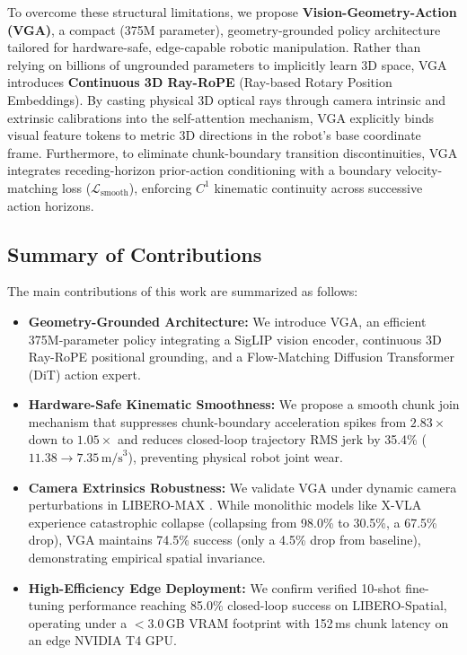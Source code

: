 To overcome these structural limitations, we propose \textbf{Vision-Geometry-Action (VGA)}, a compact (375M parameter), geometry-grounded policy architecture tailored for hardware-safe, edge-capable robotic manipulation. Rather than relying on billions of ungrounded parameters to implicitly learn 3D space, VGA introduces \textbf{Continuous 3D Ray-RoPE} (Ray-based Rotary Position Embeddings). By casting physical 3D optical rays through camera intrinsic and extrinsic calibrations into the self-attention mechanism, VGA explicitly binds visual feature tokens to metric 3D directions in the robot's base coordinate frame. Furthermore, to eliminate chunk-boundary transition discontinuities, VGA integrates receding-horizon prior-action conditioning with a boundary velocity-matching loss ($\mathcal{L}_{\text{smooth}}$), enforcing $C^1$ kinematic continuity across successive action horizons.

\subsection{Summary of Contributions}
The main contributions of this work are summarized as follows:
\begin{itemize}
    \item \textbf{Geometry-Grounded Architecture:} We introduce VGA, an efficient 375M-parameter policy integrating a SigLIP vision encoder, continuous 3D Ray-RoPE positional grounding, and a Flow-Matching Diffusion Transformer (DiT) action expert.
    \item \textbf{Hardware-Safe Kinematic Smoothness:} We propose a smooth chunk join mechanism that suppresses chunk-boundary acceleration spikes from $2.83\times$ down to $1.05\times$ and reduces closed-loop trajectory RMS jerk by 35.4\% ($11.38 \rightarrow 7.35\,\text{m/s}^3$), preventing physical robot joint wear.
    \item \textbf{Camera Extrinsics Robustness:} We validate VGA under dynamic camera perturbations in LIBERO-MAX \cite{liberomax2024}. While monolithic models like X-VLA experience catastrophic collapse (collapsing from 98.0\% to 30.5\%, a 67.5\% drop), VGA maintains 74.5\% success (only a 4.5\% drop from baseline), demonstrating empirical spatial invariance.
    \item \textbf{High-Efficiency Edge Deployment:} We confirm verified 10-shot fine-tuning performance reaching 85.0\% closed-loop success on LIBERO-Spatial, operating under a $<3.0$\,GB VRAM footprint with 152\,ms chunk latency on an edge NVIDIA T4 GPU.
\end{itemize}

